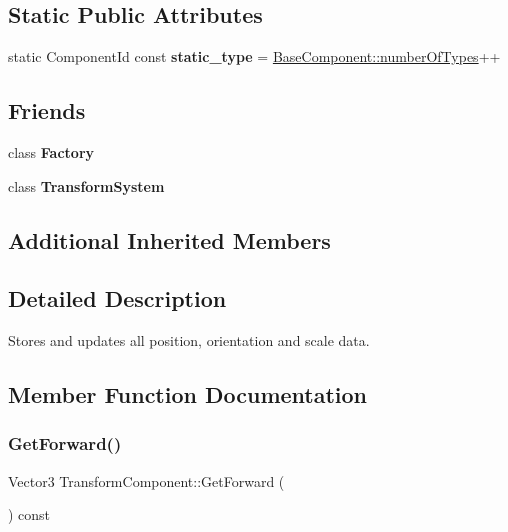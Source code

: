 \subsection*{Static Public Attributes}
\begin{DoxyCompactItemize}
\item 
\mbox{\label{classTransformComponent_a5d4711ad2a25a2d649a779d4d2842d14}} 
static Component\+Id const {\bfseries static\+\_\+type} = \hyperlink{classBaseComponent_a084ade347bc71a7f0d3b17ecdc2225a4}{Base\+Component\+::number\+Of\+Types}++
\end{DoxyCompactItemize}
\subsection*{Friends}
\begin{DoxyCompactItemize}
\item 
\mbox{\label{classTransformComponent_a328c093d609680cca505905c6d49901a}} 
class {\bfseries Factory}
\item 
\mbox{\label{classTransformComponent_a318469cfd809ba3993eb0331cba48707}} 
class {\bfseries Transform\+System}
\end{DoxyCompactItemize}
\subsection*{Additional Inherited Members}


\subsection{Detailed Description}
Stores and updates all position, orientation and scale data. 

\subsection{Member Function Documentation}
\mbox{\label{classTransformComponent_a71e0adb8dd3a35fdca3b50817bb807a4}} 
\subsubsection{\texorpdfstring{Get\+Forward()}{GetForward()}}
{\footnotesize\ttfamily Vector3 Transform\+Component\+::\+Get\+Forward (\begin{DoxyParamCaption}{ }\end{DoxyParamCaption}) const}



